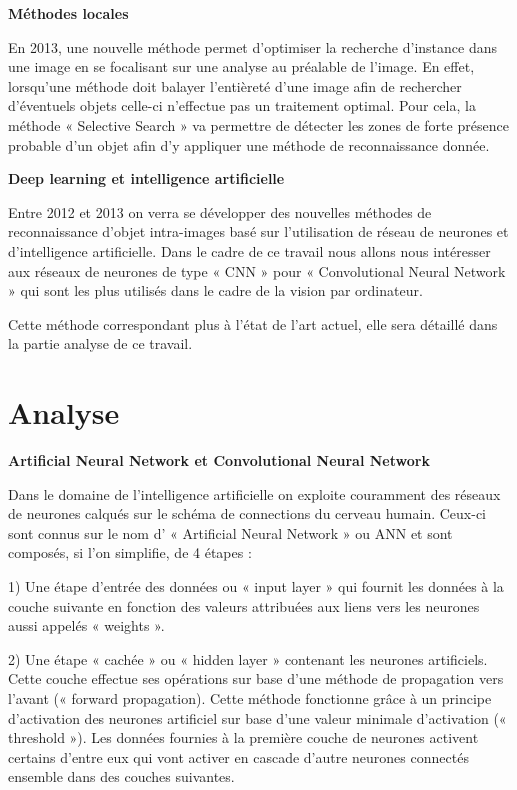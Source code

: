 \documentclass[a4paper,12pt]{article} %
\begin{document}
\newpage
\textbf{Méthodes locales}\newline
\par
En 2013, une nouvelle méthode permet d’optimiser la recherche d’instance dans une image en se focalisant sur une analyse au préalable de l’image. En effet, lorsqu’une méthode doit balayer l’entièreté d’une image afin de rechercher d’éventuels objets celle-ci n’effectue pas un traitement optimal. Pour cela, la méthode « Selective Search » va permettre de détecter les zones de forte présence probable d’un objet afin d’y appliquer une méthode de reconnaissance donnée. \newline

\textbf{Deep learning et intelligence artificielle}\newline
\par
Entre 2012 et 2013 on verra se développer des nouvelles méthodes de reconnaissance d’objet intra-images basé sur l’utilisation de réseau de neurones et d’intelligence artificielle. Dans le cadre de ce travail nous allons nous intéresser aux réseaux de neurones de type « CNN » pour « Convolutional Neural Network » qui sont les plus utilisés dans le cadre de la vision par ordinateur.\newline
\par
Cette méthode correspondant plus à l’état de l’art actuel, elle sera détaillé dans la partie analyse de ce travail.  \newline

\newpage
\section{Analyse} %

\textbf{Artificial Neural Network et Convolutional Neural Network}\newline
\par
Dans le domaine de l’intelligence artificielle on exploite couramment des réseaux de neurones calqués sur le schéma de connections du cerveau humain. Ceux-ci sont connus sur le nom d’ « Artificial Neural Network » ou ANN et sont composés, si l’on simplifie, de 4 étapes :\newline

1)	Une étape d’entrée des données ou « input layer » qui fournit les données à la couche suivante en fonction des valeurs attribuées aux liens vers les neurones aussi appelés « weights ».\newline

2)	Une étape « cachée » ou « hidden layer » contenant les neurones artificiels. Cette couche effectue ses opérations sur base d’une méthode de propagation vers l’avant (« forward propagation). Cette méthode fonctionne grâce à un principe d’activation des neurones artificiel sur base d’une valeur minimale d’activation (« threshold »). Les données fournies à la première couche de neurones activent certains d’entre eux qui vont activer en cascade d’autre neurones connectés ensemble dans des couches suivantes.\newline
\end{document}
